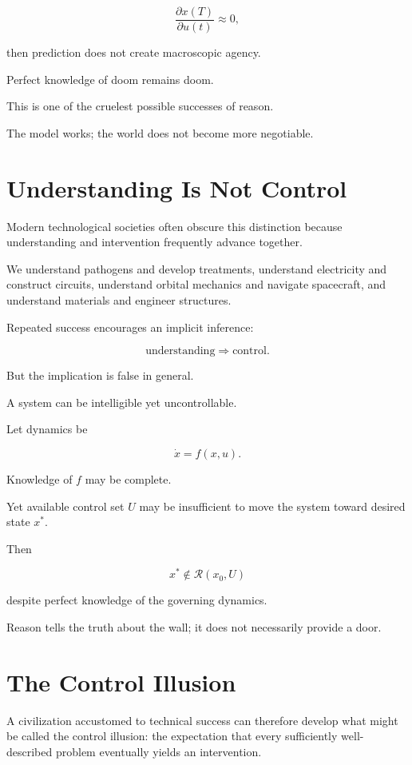 \documentclass[11pt,oneside]{book}
\theoremstyle{definition}
\theoremstyle{remark}
\newcommand{\R}{\mathcal{R}}
\begin{document}
\[
\frac{\partial x(T)}
{\partial u(t)}
\approx0,
\]

then prediction does not create macroscopic agency.

Perfect knowledge of doom remains doom.

This is one of the cruelest possible successes of reason.

The model works; the world does not become more negotiable.

\section{Understanding Is Not Control}

Modern technological societies often obscure this distinction because understanding and intervention frequently advance together.

We understand pathogens and develop treatments, understand electricity and construct circuits, understand orbital mechanics and navigate spacecraft, and understand materials and engineer structures.

Repeated success encourages an implicit inference:

\[
\text{understanding}
\Rightarrow
\text{control}.
\]

But the implication is false in general.

A system can be intelligible yet uncontrollable.

Let dynamics be

\[
\dot{x}=f(x,u).
\]

Knowledge of \(f\) may be complete.

Yet available control set \(U\) may be insufficient to move the system toward desired state \(x^\ast\).

Then

\[
x^\ast\notin\R(x_0,U)
\]

despite perfect knowledge of the governing dynamics.

Reason tells the truth about the wall; it does not necessarily provide a door.

\section{The Control Illusion}

A civilization accustomed to technical success can therefore develop what might be called the control illusion: the expectation that every sufficiently well-described problem eventually yields an intervention.
\end{document}
